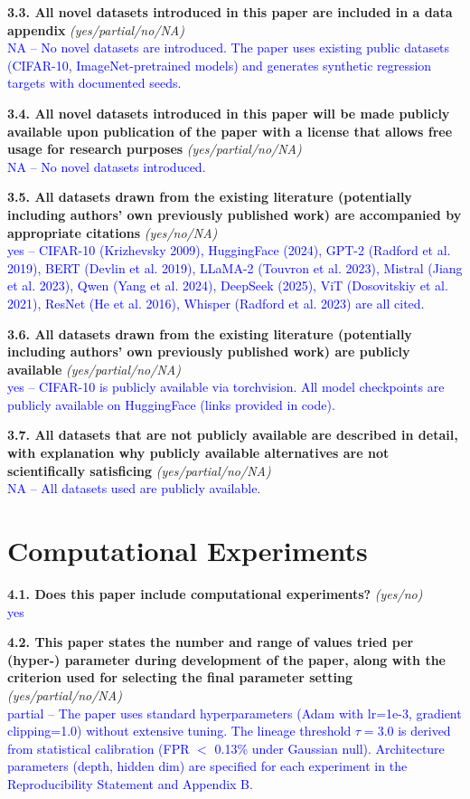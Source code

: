 \documentclass[letterpaper]{article}
\newcommand{\question}[3]{%
    \textbf{#1} \textit{#2}\\
    \textcolor{blue}{#3}\par
}
\begin{document}
\question{3.3. All novel datasets introduced in this paper are included in a data appendix}
{(yes/partial/no/NA)}
{NA -- No novel datasets are introduced. The paper uses existing public datasets (CIFAR-10, ImageNet-pretrained models) and generates synthetic regression targets with documented seeds.}

\question{3.4. All novel datasets introduced in this paper will be made publicly available upon publication of the paper with a license that allows free usage for research purposes}
{(yes/partial/no/NA)}
{NA -- No novel datasets introduced.}

\question{3.5. All datasets drawn from the existing literature (potentially including authors' own previously published work) are accompanied by appropriate citations}
{(yes/no/NA)}
{yes -- CIFAR-10 (Krizhevsky 2009), HuggingFace (2024), GPT-2 (Radford et al. 2019), BERT (Devlin et al. 2019), LLaMA-2 (Touvron et al. 2023), Mistral (Jiang et al. 2023), Qwen (Yang et al. 2024), DeepSeek (2025), ViT (Dosovitskiy et al. 2021), ResNet (He et al. 2016), Whisper (Radford et al. 2023) are all cited.}

\question{3.6. All datasets drawn from the existing literature (potentially including authors' own previously published work) are publicly available}
{(yes/partial/no/NA)}
{yes -- CIFAR-10 is publicly available via torchvision. All model checkpoints are publicly available on HuggingFace (links provided in code).}

\question{3.7. All datasets that are not publicly available are described in detail, with explanation why publicly available alternatives are not scientifically satisficing}
{(yes/partial/no/NA)}
{NA -- All datasets used are publicly available.}

\section{Computational Experiments}

\question{4.1. Does this paper include computational experiments?}
{(yes/no)}
{yes}

\question{4.2. This paper states the number and range of values tried per (hyper-) parameter during development of the paper, along with the criterion used for selecting the final parameter setting}
{(yes/partial/no/NA)}
{partial -- The paper uses standard hyperparameters (Adam with lr=1e-3, gradient clipping=1.0) without extensive tuning. The lineage threshold $\tau=3.0$ is derived from statistical calibration (FPR $<$ 0.13\% under Gaussian null). Architecture parameters (depth, hidden dim) are specified for each experiment in the Reproducibility Statement and Appendix B.}
\end{document}
